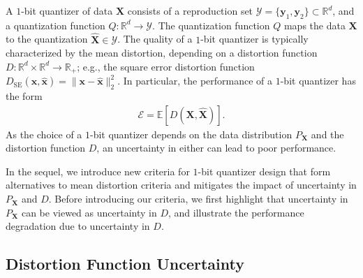 \documentclass[journal]{IEEEtran}
\begin{document}
A $1$-bit quantizer of data $\mathbf{X}$ consists of a reproduction set $\mathcal{Y} = \{\mathbf{y}_1,\mathbf{y}_2\} \subset \mathbb{R}^d$, and a quantization function $Q: \mathbb{R}^d \rightarrow \mathcal{Y}$. The quantization function $Q$ maps the data $\mathbf{X}$ to the quantization $\hat{\mathbf{X}} \in \mathcal{Y}$. The quality of a $1$-bit quantizer is typically characterized by the mean distortion, depending on a distortion function $D: \mathbb{R}^d \times \mathbb{R}^d \rightarrow \mathbb{R}_+$; e.g., the square error distortion function $D_{\mathrm{SE}}(\mathbf{x},\hat{\mathbf{x}}) = \|\mathbf{x} - \hat{\mathbf{x}}\|_2^2$. In particular, the performance of a $1$-bit quantizer has the form 
\begin{align}
	\mathcal{E} = \mathbb{E}[D(\mathbf{X},\hat{\mathbf{X}})].
\end{align}
As the choice of a $1$-bit quantizer depends on the data distribution $P_{\mathbf{X}}$ and the distortion function $D$, an uncertainty in either can lead to poor performance. %

In the sequel, we introduce new criteria for $1$-bit quantizer design that form alternatives to mean distortion criteria and mitigates the impact of uncertainty in $P_{\mathbf{X}}$ and $D$. Before introducing our criteria, we first highlight that uncertainty in $P_{\mathbf{X}}$ can be viewed as uncertainty in $D$, and illustrate the performance degradation due to uncertainty in $D$.   

\subsection{Distortion Function Uncertainty}\label{sec:p_X_uncertainty}
\end{document}

